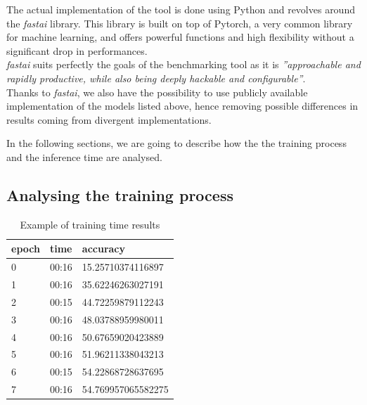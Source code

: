 The actual implementation of the tool is done using Python and revolves around the \textit{fastai} library. This library is built on top of Pytorch, a very common library for machine learning, and offers powerful functions and high flexibility without a significant drop in performances. \cite{fastai}\\
\textit{fastai} suits perfectly the goals of the benchmarking tool as it is \textit{''approachable and rapidly productive, while also being deeply hackable and configurable''}. \cite{fastai}\\
Thanks to \textit{fastai}, we also have the possibility to use publicly available implementation of the models listed above, hence removing possible differences in results coming from divergent implementations. 

In the following sections, we are going to describe how the the training process and the inference time are analysed. 

\subsection{Analysing the training process}\label{sec:training_process_bench}

\begin{table}[h]
\centering
\begin{tabular}{ p{2cm} p{2cm} p{3.5cm}   }
 epoch&time&accuracy\\
 \hline
0&00:16&15.25710374116897\\
1&00:16&35.62246263027191\\
2&00:15&44.72259879112243\\
3&00:16&48.03788959980011\\
4&00:16&50.67659020423889\\
5&00:16&51.96211338043213\\
6&00:15&54.22868728637695\\
7&00:16&54.769957065582275\\
 \hline
\end{tabular}
\caption[Example of training time results]{Example of training time results}
\label{tab:m_fast_time}
\end{table}

